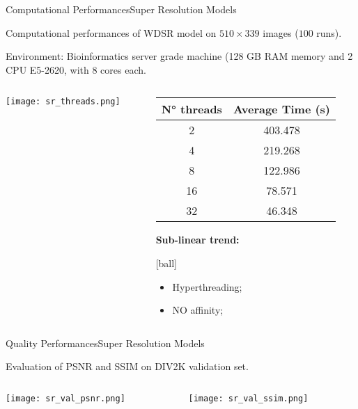 \documentclass[10pt, technote, oribibl, unicode]{beamer}
\begin{document}
\begin{frame}{Computational Performances}{Super Resolution Models}

  \scriptsize{Computational performances of WDSR model on $510\times339$ images ($100$ runs).}

  \scriptsize{Environment: Bioinformatics server grade machine (128 GB RAM memory and 2 CPU E5-2620, with 8 cores each.}

  \vfill
  \begin{columns}
    \begin{column}{0.6\textwidth}
      \texttt{[image: sr\_threads.png]}
    \end{column}
    \begin{column}{0.4\textwidth}
      \scriptsize{
      \begin{tabular}{cc}
        \hline \rowcolor{NormalBlue}
        \textbf{N° threads} & \textbf{Average Time (s)} \\
        \hline
         2                  & 403.478                   \\
         4                  & 219.268                   \\
         8                  & 122.986                   \\
        16                  & 78.571                    \\
        32                  & 46.348                    \\
        \hline
      \end{tabular}
      }

      \vspace{0.5cm}
      \scriptsize{\textbf{Sub-linear trend:}}

      [ball]

      \begin{itemize}
        \item \scriptsize{Hyperthreading;}
        \item \scriptsize{NO affinity;}
      \end{itemize}
    \end{column}
  \end{columns}

\end{frame}


\begin{frame}{Quality Performances}{Super Resolution Models}

  \scriptsize{Evaluation of PSNR and SSIM on DIV2K validation set.}

  \begin{columns}
    \begin{column}{0.5\textwidth}
      \texttt{[image: sr\_val\_psnr.png]}
    \end{column}
    \begin{column}{0.5\textwidth}
      \texttt{[image: sr\_val\_ssim.png]}
    \end{column}
  \end{columns}

\end{frame}
\end{document}
